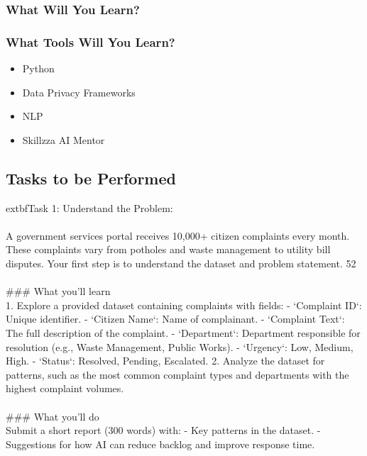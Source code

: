 \documentclass{article}
\begin{document}
\subsubsection*{What Will You Learn?}
\begin{itemize}
\end{itemize}

\subsubsection*{What Tools Will You Learn?}
\begin{itemize}
    \item Python
    \item Data Privacy Frameworks
    \item NLP
    \item Skillzza AI Mentor
\end{itemize}

\subsection*{Tasks to be Performed}
	extbf{Task 1:} Understand the Problem:  \\
 \\
 A government services portal receives 10,000+ citizen complaints every month. These complaints vary from potholes and waste management to utility bill disputes. Your first step is to understand the dataset and problem statement. 52 \\
 \\
### What you'll learn \\
1. Explore a provided dataset containing complaints with fields: - ‘Complaint ID‘: Unique identifier. - ‘Citizen Name‘: Name of complainant. - ‘Complaint Text‘: The full description of the complaint. - ‘Department‘: Department responsible for resolution (e.g., Waste Management, Public Works). - ‘Urgency‘: Low, Medium, High. - ‘Status‘: Resolved, Pending, Escalated. 2. Analyze the dataset for patterns, such as the most common complaint types and departments with the highest complaint volumes. \\
 \\
### What you'll do \\
Submit a short report (300 words) with: - Key patterns in the dataset. - Suggestions for how AI can reduce backlog and improve response time.
\end{document}
